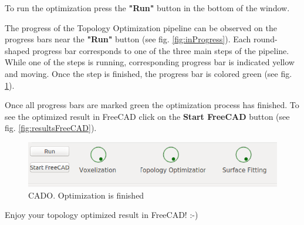 \documentclass[
12pt, %
a4paper, %
oneside, %
headinclude,footinclude, %
BCOR5mm, %
]{scrartcl}
\begin{document}
To run the optimization press the \textbf{"Run"} button in the bottom of the window.

The progress of the Topology Optimization pipeline can be observed on the progress bars near the \textbf{"Run"} button (see fig. \ref{fig:inProgress}). Each round-shaped progress bar corresponds to one of the three main steps of the pipeline. While one of the steps is running, corresponding progress bar is indicated yellow and moving. Once the step is finished, the progress bar is colored green (see fig. \ref{fig:progressBarsFinished}).


Once all progress bars are marked green the optimization process has finished. To see the optimized result in FreeCAD click on the \textbf{Start FreeCAD} button (see fig. \ref{fig:resultsFreeCAD}).
\begin{figure}
\centering
\includegraphics[scale=0.4]{Pictures/progressBar_ready.png}
\caption{CADO. Optimization is finished}
\label{fig:progressBarsFinished}
\end{figure}

Enjoy your topology optimized result in FreeCAD! :-)
\end{document}
